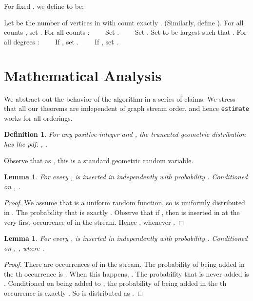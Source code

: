 \documentclass[11pt]{article}
\newtheorem{lemma}[theorem]{Lemma}
\newtheorem{definition}{Definition}
\theoremstyle{definition}
\newcommand{\est}{{\tt estimate}}
\begin{document}
For fixed , we define  to be:



\begin{algorithm}
\caption{\est} \label{alg:est}
\DontPrintSemicolon
Let  be the number of vertices in  with count exactly . (Similarly, define ).\;
For all counts , set .\;
For all counts :\;
\ \ \ \ Set .\;
\ \ \ \ Set .\;
Set  to be largest  such that .\;
For all degrees :\;
\ \ \ \ If , set .\;
\ \ \ \ If , set .\;
\end{algorithm}

\section{Mathematical Analysis} \label{sec:math}

We abstract out the behavior of the algorithm in a series of claims.
We stress that all our theorems are independent of graph stream order, and hence
\est{} works for all orderings.

\begin{definition} \label{def:geo} For any positive integer  and , the \emph{truncated
geometric distribution}  has the pdf: , .
\end{definition}

Observe that as , this is a standard geometric random variable.

\begin{lemma} \label{lem:samp-head} For every ,  is inserted in  independently with probability . Conditioned on , .
\end{lemma}

\begin{proof} We assume that  is a uniform random function, so  is uniformly distributed in .
The probability that  is exactly . Observe that if , then 
is inserted in  at the very first occurrence of  in the stream. Hence , whenever .
\end{proof}

\begin{lemma} \label{lem:samp-tail} For every ,  is inserted in  independently with probability . Conditioned on , , where .
\end{lemma}

\begin{proof} There are  occurrences of  in the stream. The probability
of  being added in the th occurrence is . When this happens,
. The probability that  is never added is .
Conditioned on  being added to , the probability of  being added
in the th occurrence is exactly .
So  is distributed as .
\end{proof}
\end{document}
